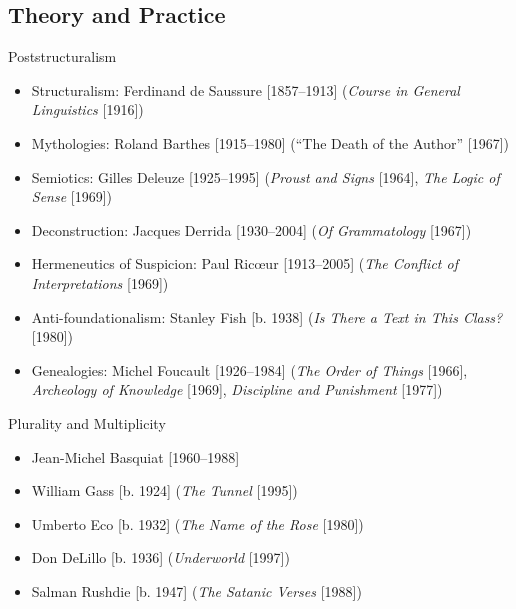 \subsection{Theory and Practice}
\begin{frame}{Poststructuralism}
	\begin{itemize}
		\item<+->Structuralism: Ferdinand de Saussure [1857--1913] (\emph{Course in General Linguistics} [1916])
		\item<+->Mythologies: Roland Barthes [1915--1980] (``The Death of the Author'' [1967])
		\item<+->Semiotics: Gilles Deleuze [1925--1995] (\emph{Proust and Signs} [1964], \emph{The Logic of Sense} [1969])
		\item<+->Deconstruction: Jacques Derrida [1930--2004] (\emph{Of Grammatology} [1967])
		\item<+->Hermeneutics of Suspicion: Paul Ric{\oe}ur [1913--2005] (\emph{The Conflict of Interpretations} [1969])
		\item<+->Anti-foundationalism: Stanley Fish [b. 1938] (\emph{Is There a Text in This Class?} [1980])
		\item<+->Genealogies: Michel Foucault [1926--1984] (\emph{The Order of Things} [1966], \emph{Archeology of Knowledge} [1969], \emph{Discipline and Punishment} [1977])
	\end{itemize}
\end{frame}

\begin{frame}{Plurality and Multiplicity}

	\begin{itemize}
		\item<1-5>Jean-Michel Basquiat [1960--1988]
		\item<2-5>William Gass [b. 1924] (\emph{The Tunnel} [1995])
		\item<3-5>Umberto Eco [b. 1932] (\emph{The Name of the Rose} [1980])
		\item<4-5>Don DeLillo [b. 1936] (\emph{Underworld} [1997])
		\item<5>Salman Rushdie [b. 1947] (\emph{The Satanic Verses} [1988])
	\end{itemize}
\end{frame}

